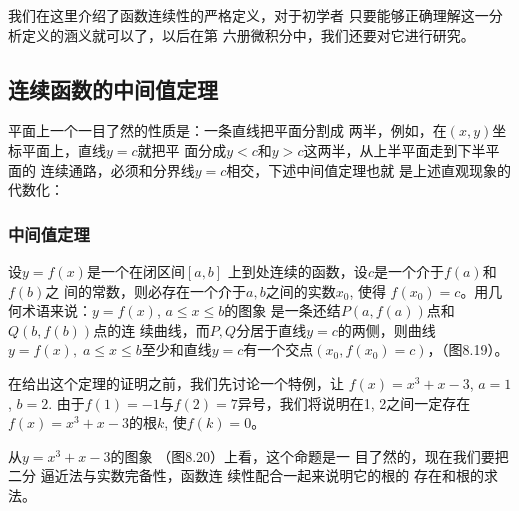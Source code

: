 我们在这里介绍了函数连续性的严格定义，对于初学者
只要能够正确理解这一分析定义的涵义就可以了，以后在第
六册微积分中，我们还要对它进行研究。

\subsection{连续函数的中间值定理}
平面上一个一目了然的性质是：一条直线把平面分割成
两半，例如，在$(x,y)$坐标平面上，直线$y=c$就把平
面分成$y<c$和$y>c$这两半，从上半平面走到下半平面的
连续通路，必须和分界线$y=c$相交，下述中间值定理也就
是上述直观现象的代数化：

\subsubsection{中间值定理}

设$y=f(x)$是一个在闭区间$[a,b]$
上到处连续的函数，设$c$是一个介于$f(a)$和$f(b)$之
间的常数，则必存在一个介于$a,b$之间的实数$x_0$, 使得
$f(x_0)=c$。用几何术语来说：$y=f(x)$, $a\le x\le b$的图象
是一条还结$P(a,f(a))$点和$Q(b,f(b))$点的连
续曲线，而$P,Q$分居于直线$y=c$的两侧，则曲线$y=
f(x),\; a\le x\le b$至少和直线$y=c$有一个交点$(x_0,
f(x_0)=c)$，（图8.19）。

\begin{figure}[htp]
    \centering
{}
    \caption{}
\end{figure}


在给出这个定理的证明之前，我们先讨论一个特例，让
$f(x)=x^3+x-3$, $a=1$, $b=2$. 由于$f(1)=-1$与$f(2)=7$异号，我们将说明在1,
2之间一定存在$f(x)=x^3+x-3$的根$k$, 使$f(k)=0$。

从$y=x^3+x-3$的图象
（图8.20）上看，这个命题是一
目了然的，现在我们要把二分
逼近法与实数完备性，函数连
续性配合一起来说明它的根的
存在和根的求法。

\begin{figure}[htp]
    \centering
{}
    \caption{}
\end{figure}


